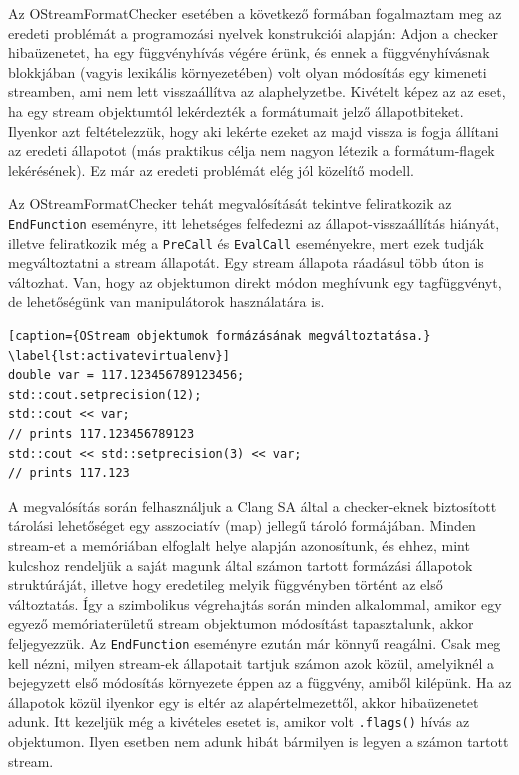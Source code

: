 \documentclass[a4paper,12pt]{report}
\begin{document}
Az OStreamFormatChecker esetében a következő formában fogalmaztam meg az eredeti problémát a programozási nyelvek konstrukciói alapján: Adjon a checker hibaüzenetet, ha egy függvényhívás végére érünk, és ennek a függvényhívásnak blokkjában (vagyis lexikális környezetében) volt olyan módosítás egy kimeneti streamben, ami nem lett visszaállítva az alaphelyzetbe. Kivételt képez az az eset, ha egy stream objektumtól lekérdezték a formátumait jelző állapotbiteket. Ilyenkor azt feltételezzük, hogy aki lekérte ezeket az majd vissza is fogja állítani az eredeti állapotot (más praktikus célja nem nagyon létezik a formátum-flagek lekérésének). Ez már az eredeti problémát elég jól közelítő modell.

Az OStreamFormatChecker tehát megvalósítását tekintve feliratkozik az \texttt{EndFunction} eseményre, itt lehetséges felfedezni az állapot-visszaállítás hiányát, illetve feliratkozik még a \texttt{PreCall} és \texttt{EvalCall} eseményekre, mert ezek tudják megváltoztatni a stream állapotát. Egy stream állapota ráadásul több úton is változhat. Van, hogy az objektumon direkt módon meghívunk egy tagfüggvényt, de lehetőségünk van manipulátorok használatára is.

\begin{lstlisting}[caption={OStream objektumok formázásának megváltoztatása.}
\label{lst:activatevirtualenv}]
double var = 117.123456789123456;
std::cout.setprecision(12);
std::cout << var;
// prints 117.123456789123
std::cout << std::setprecision(3) << var;
// prints 117.123
\end{lstlisting}

A megvalósítás során felhasználjuk a Clang SA által a checker-eknek biztosított tárolási lehetőséget egy asszociatív (map) jellegű tároló formájában. Minden stream-et a memóriában elfoglalt helye alapján azonosítunk, és ehhez, mint kulcshoz rendeljük a saját magunk által számon tartott formázási állapotok struktúráját, illetve hogy eredetileg melyik függvényben történt az első változtatás. Így a szimbolikus végrehajtás során minden alkalommal, amikor egy egyező memóriaterületű stream objektumon módosítást tapasztalunk, akkor feljegyezzük. Az \texttt{EndFunction} eseményre ezután már könnyű reagálni. Csak meg kell nézni, milyen stream-ek állapotait tartjuk számon azok közül, amelyiknél a bejegyzett első módosítás környezete éppen az a függvény, amiből kilépünk. Ha az állapotok közül ilyenkor egy is eltér az alapértelmezettől, akkor hibaüzenetet adunk. Itt kezeljük még a kivételes esetet is, amikor volt \texttt{.flags()} hívás az objektumon. Ilyen esetben nem adunk hibát bármilyen is legyen a számon tartott stream.
\end{document}
